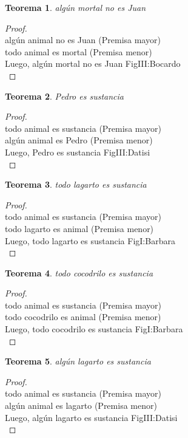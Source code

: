 ﻿\documentclass[12pt]{book}
\newtheorem{theorem}{Teorema}[chapter]
\newtheorem{proof}{Demostración}
\begin{document}
\begin{theorem}
algún mortal no es Juan
\label{th: 82}
\end{theorem}\begin{proof}\\algún animal no es Juan	 (Premisa mayor) \\todo animal es mortal	 (Premisa menor) \\Luego, algún mortal no es Juan	FigIII:Bocardo \\ \end{proof}
\begin{theorem}
Pedro es sustancia
\label{th: 83}
\end{theorem}\begin{proof}\\todo animal es sustancia	 (Premisa mayor) \\algún animal es Pedro	 (Premisa menor) \\Luego, Pedro es sustancia	FigIII:Datisi \\ \end{proof}
\begin{theorem}
todo lagarto es sustancia
\label{th: 84}
\end{theorem}\begin{proof}\\todo animal es sustancia	 (Premisa mayor) \\todo lagarto es animal	 (Premisa menor) \\Luego, todo lagarto es sustancia	FigI:Barbara \\ \end{proof}
\begin{theorem}
todo cocodrilo es sustancia
\label{th: 85}
\end{theorem}\begin{proof}\\todo animal es sustancia	 (Premisa mayor) \\todo cocodrilo es animal	 (Premisa menor) \\Luego, todo cocodrilo es sustancia	FigI:Barbara \\ \end{proof}
\begin{theorem}
algún lagarto es sustancia
\label{th: 86}
\end{theorem}\begin{proof}\\todo animal es sustancia	 (Premisa mayor) \\algún animal es lagarto	 (Premisa menor) \\Luego, algún lagarto es sustancia	FigIII:Datisi \\ \end{proof}
\end{document}

